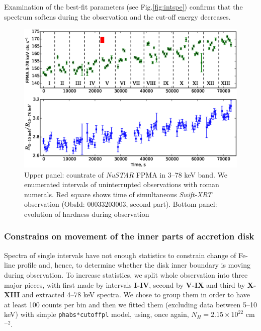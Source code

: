 \documentclass[a4paper,fleqn,usenatbib]{mnras}
\def\swiftx{{\em Swift-XRT\,}}
\def\nustar{{\em NuSTAR\,}}
\begin{document}
Examination of the best-fit parameters (see Fig.\ref{fig:intspe}) confirms that the spectrum softens during the observation and the cut-off energy decreases. 

\begin{figure}
\centerline{\includegraphics[scale=0.7]{nuAlc_color_v04.eps}}
\caption{Upper panel: countrate of \nustar\,FPMA in 3--78 keV band. We enumerated intervals of uninterrupted observations with roman numerals. Red square shows time of simultaneous \swiftx observation (ObsId: 00033203003, second part). Bottom panel: evolution of hardness during observation} 
\label{fig:nust_lc}
\end{figure} 


\subsubsection{Constrains on movement of the inner parts of accretion disk}
\label{sec:disk_constr}
Spectra of single intervals have not enough statistics to constrain change of Fe-line profile and, hence, to determine whether the disk inner boundary  is moving during observation. 
To increase statistics, we split whole observation into three major pieces, with first made by intervals {\bf I-IV}, second by {\bf V-IX} and third by {\bf X-XIII} and extracted 4--78 keV spectra. 
We chose to group them in order to have at least 100 counts per bin and then we fitted them (excluding data between 5--10 keV) with simple \texttt{phabs*cutoffpl} model, using, once again, $N_{H} = 2.15\times10^{22}$ cm$^{-2}$.  
\end{document}
